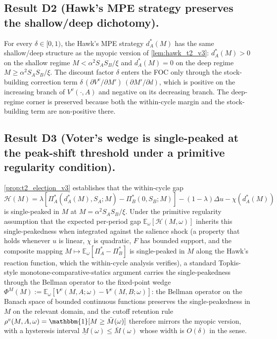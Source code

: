 \documentclass[11pt,twoside]{extarticle}
\begin{document}
\subsection*{Result D2 (Hawk's MPE strategy preserves the shallow/deep dichotomy).} For every $\delta\in[0,1)$, the Hawk's MPE strategy $d_A^*(M)$ has the same shallow/deep structure as the myopic version of \autoref{lem:hawk_t2_v3}: $d_A^*(M)>0$ on the shallow regime $M<\alpha^2 S_A S_B/\xi$ and $d_A^*(M)=0$ on the deep regime $M\ge\alpha^2 S_A S_B/\xi$. The discount factor $\delta$ enters the FOC only through the stock-building correction term $\delta\,(\partial V^v/\partial M')\,(\partial M'/\partial d)$, which is positive on the increasing branch of $V^v(\cdot,A)$ and negative on its decreasing branch. The deep-regime corner is preserved because both the within-cycle margin and the stock-building term are non-positive there.

\subsection*{Result D3 (Voter's wedge is single-peaked at the peak-shift threshold under a primitive regularity condition).} \autoref{prop:t2_election_v3} establishes that the within-cycle gap $\mathcal H(M)=\lambda[\Pi_A^*(d_A^*(M),S_A;M)-\Pi_B^*(0,S_B;M)]-(1-\lambda)\Delta u-\chi(d_A^*(M))$ is single-peaked in $M$ at $M=\alpha^2 S_A S_B/\xi$. Under the primitive regularity assumption that the expected per-period gap $\mathbb E_\omega[\mathcal H(M,\omega)]$ inherits this single-peakedness when integrated against the salience shock (a property that holds whenever $u$ is linear, $\chi$ is quadratic, $F$ has bounded support, and the composite mapping $M\mapsto\mathbb E_\omega[\Pi_A^*-\Pi_B^*]$ is single-peaked in $M$ along the Hawk's reaction function, which the within-cycle analysis verifies), a standard Topkis-style monotone-comparative-statics argument carries the single-peakedness through the Bellman operator to the fixed-point wedge $\Phi^M(M):=\mathbb E_\omega[V^v(M,A;\omega)-V^v(M,B;\omega)]$: the Bellman operator on the Banach space of bounded continuous functions preserves the single-peakedness in $M$ on the relevant domain, and the cutoff retention rule $\rho^v(M,A,\omega)=\mathbbm{1}[M\ge\bar M(\omega)]$ therefore mirrors the myopic version, with a hysteresis interval $\underline M(\omega)\le\bar M(\omega)$ whose width is $O(\delta)$ in the \citet{coatePolicyPersistence1999} sense.
\end{document}
